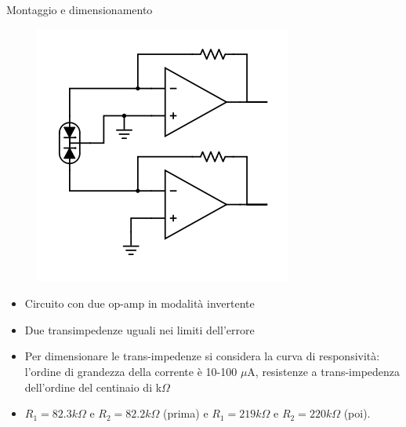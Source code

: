 \documentclass{beamer}
\begin{document}
\begin{frame}{Montaggio e dimensionamento}
\begin{figure}
\centering
\includegraphics[width=0.3\linewidth]{./analog_scheme}
\end{figure}

\fontsize{10}{12}
\begin{itemize}
\item Circuito con due op-amp in modalità invertente
\item Due transimpedenze uguali nei limiti dell'errore 
\item Per dimensionare le trans-impedenze si considera la curva di responsività: l'ordine di grandezza della corrente è 10-100 $\mu$A, resistenze a trans-impedenza dell'ordine del centinaio di k$\Omega$
\item $R_1 = 82.3 k\Omega$ e $R_2 = 82.2 k\Omega$ (prima) e $R_1 = 219 k\Omega$ e $R_2 = 220 k\Omega$ (poi).
\end{itemize}
\end{frame}
\end{document}
